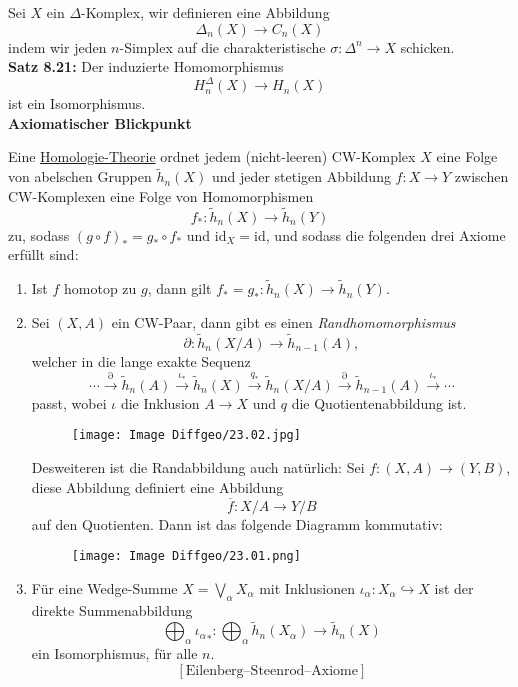\documentclass[fleqn, 12pt, letterpaper]{article}
\begin{document}
Sei $X$ ein $\Delta$-Komplex, wir definieren eine Abbildung 
\[
\Delta_n(X) \to C_n(X)
\]
indem wir jeden $n$-Simplex auf die charakteristische $\sigma \colon \Delta^n \to X$ schicken.\\

\textbf{Satz 8.21:} Der induzierte Homomorphismus 
\[
H_n^\Delta(X) \to H_n(X)
\]
ist ein {Isomorphismus}.\\

\textbf{Axiomatischer Blickpunkt}

Eine \underline{Homologie-Theorie} ordnet jedem (nicht-leeren) CW-Komplex $X$ eine Folge von abelschen Gruppen $\widetilde{h}_n(X)$
und jeder stetigen Abbildung $f \colon X \to Y$ zwischen CW-Komplexen eine Folge von Homomorphismen 
\[
f_* \colon \widetilde{h}_n(X) \to \widetilde{h}_n(Y)
\]
zu, sodass $(g \circ f)_* = g_* \circ f_*$ und $\mathrm{id}_X = \mathrm{id}$, und sodass die folgenden drei Axiome erfüllt sind:

\begin{enumerate}
    \item Ist $f$ homotop zu $g$, dann gilt $f_* = g_* \colon \widetilde{h}_n(X) \to \widetilde{h}_n(Y)$.
    
    \item Sei $(X, A)$ ein CW-Paar, dann gibt es einen \emph{Randhomomorphismus}
    \[
    \partial \colon \widetilde{h}_n(X/A) \to \widetilde{h}_{n-1}(A),
    \]
    welcher in die lange exakte Sequenz
    \[
    \cdots \overset{\partial}{\to} \widetilde{h}_n(A) \xrightarrow{\iota_*} \widetilde{h}_n(X) \xrightarrow{q_*} \widetilde{h}_n(X/A) \xrightarrow{\partial} \widetilde{h}_{n-1}(A) \xrightarrow{\iota_*} \cdots
    \]
    passt, wobei $\iota$ die Inklusion $A \to X$ und $q$ die Quotientenabbildung ist.
    \begin{figure}[H]
    \centering
    \texttt{[image: Image Diffgeo/23.02.jpg]}
 \end{figure}

    Desweiteren ist die Randabbildung auch natürlich: Sei $f \colon (X, A) \to (Y, B)$, diese Abbildung definiert eine Abbildung
\[
\overline{f} \colon X/A \to Y/B
\]
auf den Quotienten. Dann ist das folgende Diagramm kommutativ:
\begin{figure}[H]
    \centering
    \texttt{[image: Image Diffgeo/23.01.png]}
 \end{figure}
 \item Für eine Wedge-Summe $X = \bigvee_\alpha X_\alpha$ mit Inklusionen $\iota_\alpha \colon X_\alpha \hookrightarrow X$
ist der direkte Summenabbildung
\[
\bigoplus_\alpha{\iota_\alpha}_*:\bigoplus_\alpha \widetilde{h}_n(X_\alpha) \rightarrow \widetilde{h}_n(X)
\]
ein Isomorphismus, für alle $n$.
\[
\left[ \text{Eilenberg--Steenrod--Axiome} \right]
\]
\end{enumerate}
\end{document}
